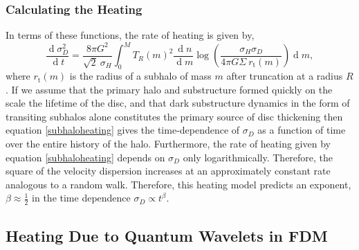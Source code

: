 \documentclass[usenatbib]{mnras}
\renewcommand{\d}[1]{\! \mathrm{d}#1 \:}
\newcommand{\deriv}[2]{\frac{\d{#1}}{\d{#2}}}
\renewcommand{\d}[1]{\ensuremath{\operatorname{d}\!{#1}}}
\begin{document}
\subsubsection{Calculating the Heating}

In terms of these functions, the rate of heating is given by,
\begin{equation} \label{subhaloheating}
\deriv{\sigma_D^2}{t} = \frac{8 \pi G^2}{\sqrt{2} \: \sigma_H} \int_0^{M} T_R(m)^2  \deriv{n}{m}  \log{\left( \frac{\sigma_H \sigma_D}{4 \pi G \Sigma \: r_{\text{t}}(m)} \right)} \d{m},
\end{equation}   
where $r_{\text{t}}(m)$ is the radius of a subhalo of mass $m$ after truncation at a radius $R$. 
If we assume that the primary halo and substructure formed quickly on the scale the lifetime of the disc, and that dark substructure dynamics in the form of transiting subhalos alone constitutes the primary source of disc thickening then equation \eqref{subhaloheating} gives the time-dependence of $\sigma_D$ as a function of time over the entire history of the halo. Furthermore, the rate of heating given by equation \eqref{subhaloheating} depends on $\sigma_D$ only logarithmically. Therefore, the square of the velocity dispersion increases at an approximately constant rate analogous to a random walk. Therefore, this heating model predicts an exponent, $\beta \approx \tfrac{1}{2}$ in the time dependence $\sigma_D \propto t^{\beta}$.

\subsection{Heating Due to Quantum Wavelets in FDM}
\end{document}
